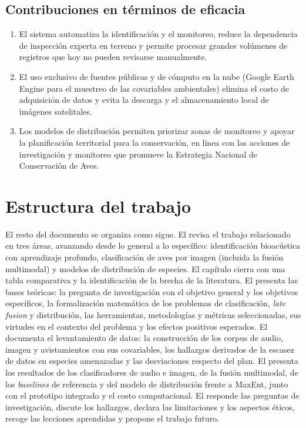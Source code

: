 \subsection{Contribuciones en términos de eficacia}

\begin{enumerate}[leftmargin=*, itemsep=2pt]
  \item El sistema automatiza la identificación y el monitoreo, reduce la
        dependencia de inspección experta en terreno y permite procesar
        grandes volúmenes de registros que hoy no pueden revisarse manualmente.
  \item El uso exclusivo de fuentes públicas y de cómputo en la nube (Google
        Earth Engine para el muestreo de las covariables ambientales) elimina
        el costo de adquisición de datos y evita la descarga y el almacenamiento
        local de imágenes satelitales.
  \item Los modelos de distribución permiten priorizar zonas de monitoreo y
        apoyar la planificación territorial para la conservación, en línea con
        las acciones de investigación y monitoreo que promueve la Estrategia
        Nacional de Conservación de Aves.
\end{enumerate}

\section{Estructura del trabajo}\label{sec:estructura}

El resto del documento se organiza como sigue. El 
revisa el trabajo relacionado en tres áreas, avanzando desde lo general a lo
específico: identificación bioacústica con aprendizaje profundo,
clasificación de aves por imagen (incluida la fusión multimodal) y modelos
de distribución de especies. El capítulo cierra con una tabla comparativa y la
identificación de la brecha de la literatura. El  presenta
las bases teóricas: la pregunta de investigación con el objetivo general y
los objetivos específicos, la formalización matemática de los problemas de
clasificación, \textit{late fusion} y distribución, las herramientas, metodologías y
métricas seleccionadas, sus virtudes en el contexto del problema y los
efectos positivos esperados. El  documenta el
levantamiento de datos: la construcción de los corpus de audio, imagen y
avistamientos con sus covariables, los hallazgos derivados de la escasez de
datos en especies amenazadas y las desviaciones respecto del plan. El
 presenta los resultados de los clasificadores de
audio e imagen, de la fusión multimodal, de los \textit{baselines} de
referencia y del modelo de distribución frente a MaxEnt, junto con el
prototipo integrado y el costo computacional. El 
responde las preguntas de investigación, discute los hallazgos, declara las limitaciones y los aspectos éticos, recoge las lecciones
aprendidas y propone el trabajo futuro.
